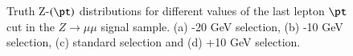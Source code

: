 \begin{figure}[htbp]
	\centering
	\hfill
	\caption{Truth Z-$(\pt)$ distributions for different values of the last lepton $\pt$ cut in the $Z\to\mu\mu$ signal sample. (a) -20 GeV selection, (b) -10 GeV selection, (c) standard selection and (d) +10 GeV selection.}
	\label{Fig14}
\end{figure}





